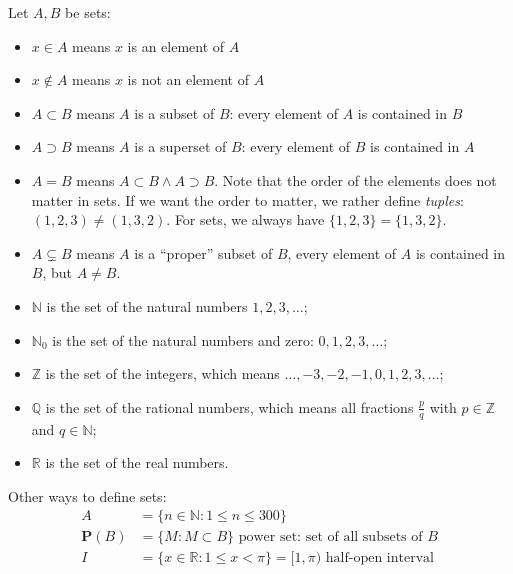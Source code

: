 \begin{notation}
Let $A,B$ be sets:
\begin{itemize}
 \item $x \in A$ means $x$ is an element of $A$
 \item $x\not\in A$ means $x$ is not an element of $A$
 \item $A \subset B$ means $A$ is a subset of $B$: every element of $A$ is contained in $B$
 \item $A \supset B$ means $A$ is a superset of $B$: every element of $B$ is contained in $A$
 \item $A=B$ means $A \subset B \wedge A \supset B$. 
 Note that the order of the elements does not matter in sets.
 If we want the order to matter, we rather define \emph{tuples}:
$(1,2,3) \neq (1,3,2)$. For sets, we always have $\{ 1,2,3 \} = \{1, 3,2\}$.
 \item $A \subsetneq B$ means $A$ is a ``proper'' subset of $B$, every element of $A$ is contained in $B$, but $A \neq B$. 
 \end{itemize}
\end{notation}

\begin{Boxx}
\begin{itemize}\itemsep0mm
    \item $\mathbb{N}$ is the set of the natural numbers $1,2,3,\ldots$; 
    \item $\mathbb{N}_0$ is the set of the natural numbers and zero: $0, 1, 2, 3,\dots$;
    \item $\mathbb{Z}$ is the set of the integers, which means  $\ldots,-3,-2,-1,0,1,2,3,\ldots$;
\item $\mathbb{Q}$ is the set of the rational numbers, which means 
  all fractions $\frac pq$ with $p\in\mathbb{Z}$ and $q\in\mathbb{N}$;
\item $\mathbb{R}$ is the set of the real numbers.
\end{itemize}
\end{Boxx}

Other ways to define sets:
\begin{align*}
 A &= \{ n \in \mathbb{N} : 1 \le n \le 300 \}\\
 \mathbf{P}(B) &= \{ M : M \subset B \} \mbox{ power set: set of all subsets of } B\\
 I &= \{ x\in \mathbb{R} : 1 \le x < \pi \} = [1,\pi) \mbox{ half-open interval }
\end{align*}
%

